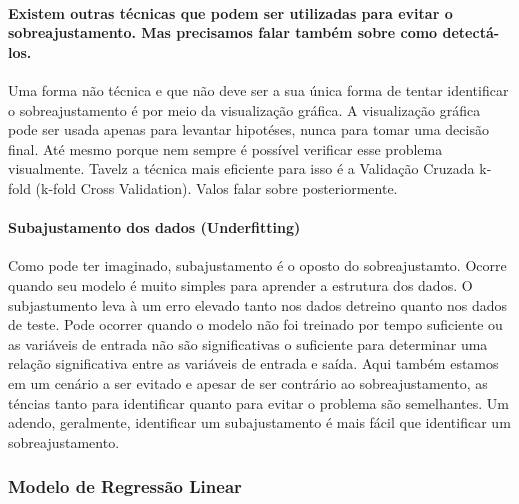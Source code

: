 \documentclass[
  letterpaper,
  DIV=11,
  numbers=noendperiod]{scrreprt}
\let\oldparagraph\paragraph
\renewcommand{\paragraph}[1]{\oldparagraph{#1}\mbox{}}
\begin{document}
\hypertarget{existem-outras-tuxe9cnicas-que-podem-ser-utilizadas-para-evitar-o-sobreajustamento.-mas-precisamos-falar-tambuxe9m-sobre-como-detectuxe1-los.}{%
\paragraph{Existem outras técnicas que podem ser utilizadas para evitar
o sobreajustamento. Mas precisamos falar também sobre como
detectá-los.}\label{existem-outras-tuxe9cnicas-que-podem-ser-utilizadas-para-evitar-o-sobreajustamento.-mas-precisamos-falar-tambuxe9m-sobre-como-detectuxe1-los.}}

Uma forma não técnica e que não deve ser a sua única forma de tentar
identificar o sobreajustamento é por meio da visualização gráfica. A
visualização gráfica pode ser usada apenas para levantar hipotéses,
nunca para tomar uma decisão final. Até mesmo porque nem sempre é
possível verificar esse problema visualmente. Tavelz a técnica mais
eficiente para isso é a Validação Cruzada k-fold (k-fold Cross
Validation). Valos falar sobre posteriormente.

\hypertarget{subajustamento-dos-dados-underfitting}{%
\paragraph{\texorpdfstring{Subajustamento dos dados
(\textbf{Underfitting})}{Subajustamento dos dados (Underfitting)}}\label{subajustamento-dos-dados-underfitting}}

Como pode ter imaginado, subajustamento é o oposto do sobreajustamto.
Ocorre quando seu modelo é muito simples para aprender a estrutura dos
dados. O subjastumento leva à um erro elevado tanto nos dados detreino
quanto nos dados de teste. Pode ocorrer quando o modelo não foi treinado
por tempo suficiente ou as variáveis \hspace{0pt}\hspace{0pt}de entrada
não são significativas o suficiente para determinar uma relação
significativa entre as variáveis \hspace{0pt}\hspace{0pt}de entrada e
saída. Aqui também estamos em um cenário a ser evitado e apesar de ser
contrário ao sobreajustamento, as téncias tanto para identificar quanto
para evitar o problema são semelhantes. Um adendo, geralmente,
identificar um subajustamento é mais fácil que identificar um
sobreajustamento.

\hypertarget{modelo-de-regressuxe3o-linear}{%
\subsubsection{Modelo de Regressão
Linear}\label{modelo-de-regressuxe3o-linear}}
\end{document}
